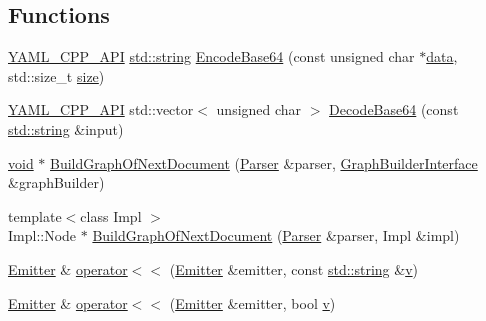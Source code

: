 \subsection*{Functions}
\begin{DoxyCompactItemize}
\item 
\mbox{\hyperlink{dll_8h_a70903db05b58f40db9aa4f966658fa65}{Y\+A\+M\+L\+\_\+\+C\+P\+P\+\_\+\+A\+PI}} \mbox{\hyperlink{glad_8h_ac83513893df92266f79a515488701770}{std\+::string}} \mbox{\hyperlink{namespace_y_a_m_l_a6374754e4efbcb1c4677b3c73d8ff19a}{Encode\+Base64}} (const unsigned char $\ast$\mbox{\hyperlink{glad_8h_a0f78eecb0891cce3bdfc815b971866a1}{data}}, std\+::size\+\_\+t \mbox{\hyperlink{glad_8h_a79ef9eb3e59c4bb34c4b9fbeb8d28ff7}{size}})
\item 
\mbox{\hyperlink{dll_8h_a70903db05b58f40db9aa4f966658fa65}{Y\+A\+M\+L\+\_\+\+C\+P\+P\+\_\+\+A\+PI}} std\+::vector$<$ unsigned char $>$ \mbox{\hyperlink{namespace_y_a_m_l_af47440bbb5fd6e209f0284c0693878c6}{Decode\+Base64}} (const \mbox{\hyperlink{glad_8h_ac83513893df92266f79a515488701770}{std\+::string}} \&input)
\item 
\mbox{\hyperlink{glad_8h_a950fc91edb4504f62f1c577bf4727c29}{void}} $\ast$ \mbox{\hyperlink{namespace_y_a_m_l_a6a8d7258e92d4f2150869d90a45addc1}{Build\+Graph\+Of\+Next\+Document}} (\mbox{\hyperlink{class_y_a_m_l_1_1_parser}{Parser}} \&parser, \mbox{\hyperlink{class_y_a_m_l_1_1_graph_builder_interface}{Graph\+Builder\+Interface}} \&graph\+Builder)
\item 
{\footnotesize template$<$class Impl $>$ }\\Impl\+::\+Node $\ast$ \mbox{\hyperlink{namespace_y_a_m_l_a4c1897a86c4a186c3296347c51341dd1}{Build\+Graph\+Of\+Next\+Document}} (\mbox{\hyperlink{class_y_a_m_l_1_1_parser}{Parser}} \&parser, Impl \&impl)
\item 
\mbox{\hyperlink{class_y_a_m_l_1_1_emitter}{Emitter}} \& \mbox{\hyperlink{namespace_y_a_m_l_ad72a35c39be1f1b4a74c7887919e5faf}{operator$<$$<$}} (\mbox{\hyperlink{class_y_a_m_l_1_1_emitter}{Emitter}} \&emitter, const \mbox{\hyperlink{glad_8h_ac83513893df92266f79a515488701770}{std\+::string}} \&\mbox{\hyperlink{glad_8h_a14cfbe2fc2234f5504618905b69d1e06}{v}})
\item 
\mbox{\hyperlink{class_y_a_m_l_1_1_emitter}{Emitter}} \& \mbox{\hyperlink{namespace_y_a_m_l_ad2317fbe93846e871edbd55c58d27a2a}{operator$<$$<$}} (\mbox{\hyperlink{class_y_a_m_l_1_1_emitter}{Emitter}} \&emitter, bool \mbox{\hyperlink{glad_8h_a14cfbe2fc2234f5504618905b69d1e06}{v}})
\item 

\end{DoxyCompactItemize}
